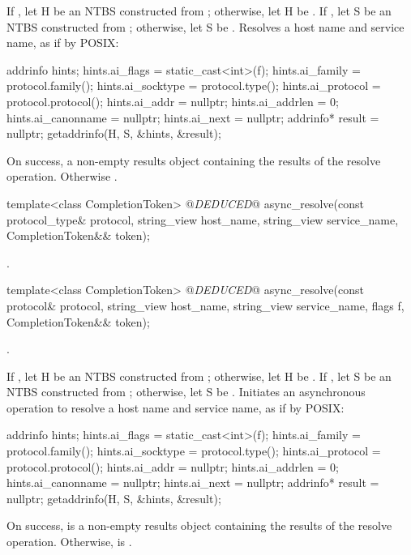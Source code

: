 \begin{itemdescr}
\pnum
\effects If , let H be an NTBS constructed from ; otherwise, let H be . If , let S be an NTBS constructed from ; otherwise, let S be . Resolves a host name and service name, as if by POSIX: 
\begin{codeblock}
addrinfo hints;
hints.ai_flags = static_cast<int>(f);
hints.ai_family = protocol.family();
hints.ai_socktype = protocol.type();
hints.ai_protocol = protocol.protocol();
hints.ai_addr = nullptr;
hints.ai_addrlen = 0;
hints.ai_canonname = nullptr;
hints.ai_next = nullptr;
addrinfo* result = nullptr;
getaddrinfo(H, S, &hints, &result);
\end{codeblock}


\pnum
\returns On success, a non-empty results object containing the results of the resolve operation. Otherwise .
\end{itemdescr}

\begin{itemdecl}
template<class CompletionToken>
  @\textit{DEDUCED}@ async_resolve(const protocol_type& protocol,
                        string_view host_name, string_view service_name,
                        CompletionToken&& token);
\end{itemdecl}

\begin{itemdescr}
\pnum
\returns {}.
\end{itemdescr}

\begin{itemdecl}
template<class CompletionToken>
  @\textit{DEDUCED}@ async_resolve(const protocol& protocol,
                        string_view host_name, string_view service_name,
                        flags f, CompletionToken&& token);
\end{itemdecl}

\begin{itemdescr}
\pnum
\completionsig {}.

\pnum
\effects If , let H be an NTBS constructed from ; otherwise, let H be . If , let S be an NTBS constructed from ; otherwise, let S be . Initiates an asynchronous operation to resolve a host name and service name, as if by POSIX: 
\begin{codeblock}
addrinfo hints;
hints.ai_flags = static_cast<int>(f);
hints.ai_family = protocol.family();
hints.ai_socktype = protocol.type();
hints.ai_protocol = protocol.protocol();
hints.ai_addr = nullptr;
hints.ai_addrlen = 0;
hints.ai_canonname = nullptr;
hints.ai_next = nullptr;
addrinfo* result = nullptr;
getaddrinfo(H, S, &hints, &result);
\end{codeblock}
 On success,  is a non-empty results object containing the results of the resolve operation. Otherwise,  is .
\end{itemdescr}

